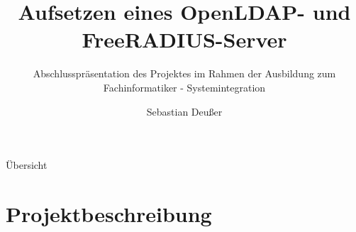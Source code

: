 \documentclass[presentation,svgnames,12pt]{beamer}
\title[OpenLDAP- und FreeRADIUS-Server]   %
{Aufsetzen eines OpenLDAP- und FreeRADIUS-Server}
\subtitle
{Abschlusspräsentation des Projektes im Rahmen der Ausbildung zum Fachinformatiker - Systemintegration} %
\author %
{Sebastian Deußer}
\begin{document}
\setcounter{framenumber}{-1}
{
\frame{\titlepage}
}

\section{}
\begin{frame}{Übersicht}
\tableofcontents
\end{frame}
\note{}

\let\olditemize\itemize %
\renewcommand\itemize{\olditemize\addtolength{\itemsep}{12pt}}

\let\oldenumerate\enumerate %
\renewcommand\enumerate{\oldenumerate\addtolength{\itemsep}{12pt}}


\section{Projektbeschreibung}
\end{document}
